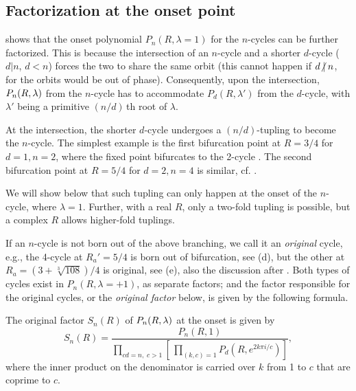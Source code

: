 \documentclass[twocolumn]{revtex4-1}
\begin{document}
\subsection{\label{sec:origfac}Factorization at the onset point}


 shows that
the onset polynomial
  $P_n(R, \lambda = 1)$ for the $n$-cycles
  can be further factorized.
%
This is because the intersection of an $n$-cycle
  and a shorter $d$-cycle ($d|n$, $d < n$)
  forces the two to share the same orbit
  (this cannot happen if $d \centernot| n$,
  for the orbits would be out of phase).
%
Consequently, upon the intersection,
  $P_n(R, \lambda)$ from the $n$-cycle
  has to accommodate $P_d(R, \lambda')$ from the $d$-cycle,
  with $\lambda'$ being a primitive $(n/d)\,$th root of $\lambda$.

At the intersection,
  the shorter $d$-cycle undergoes
  a $(n/d)$-tupling to become the $n$-cycle.
%
The simplest example is the first bifurcation point
  at $R = 3/4$ for $d = 1, n = 2$,
  where the fixed point 
  bifurcates to
  the 2-cycle .
The second bifurcation point at $R=5/4$ for $d = 2, n = 4$ is similar,
  cf. .


We will show below that such tupling can only happen
  at the onset of the $n$-cycle, where $\lambda = 1$.
%
Further, with a real $R$, only a two-fold tupling is possible,
  but a complex $R$ allows higher-fold tuplings.



If an $n$-cycle is not born out of the above branching,
  we call it an \emph{original} cycle,
  e.g., the 4-cycle at $R_a' = 5/4$
  is born out of bifurcation, see (d),
  but the other at $R_a = (3+\sqrt[3]{108})/4$
  is original, see (e),
  also the discussion after .
%
Both types of cycles exist in $P_n(R, \lambda = +1)$,
  as separate factors;
and the factor responsible for the original cycles,
  or the \emph{original factor} below,
  is given by the following formula.


\begin{theorem}
  The original factor $S_n(R)$ of $P_n(R, \lambda)$ at the onset is given by
  \begin{equation}
    S_n(R)
    = \frac
    {
      P_n(R, 1)
    }
    {
      \prod_{c d =  n, \; c > 1}
      \left[ \,
        \prod_{(k, c) = 1}
      P_{d}
        \left(
          R, e^{2k\pi i/c}
        \right)
      \right]
    },
  \label{eq:origfac}
  \end{equation}
  where the inner product on the denominator is carried over
   $k$ from 1 to $c$ that are coprime to $c$.
  \label{thm:origfac}
\end{theorem}
\end{document}
